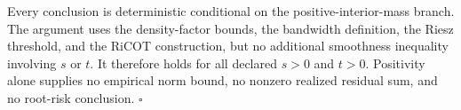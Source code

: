 Every conclusion is deterministic conditional on the positive-interior-mass branch. The argument uses the density-factor bounds, the bandwidth definition, the Riesz threshold, and the RiCOT construction, but no additional smoothness inequality involving \(s\) or \(t\). It therefore holds for all declared \(s>0\) and \(t>0\). Positivity alone supplies no empirical norm bound, no nonzero realized residual sum, and no root-risk conclusion. \(\square\)